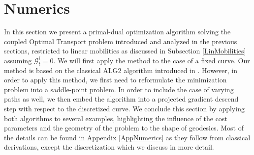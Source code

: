 \documentclass{article}
\def\calG{{\mathcal G}} \def\calH{{\mathcal H}} \def\calI{{\mathcal I}}
\begin{document}
\section{Numerics}\label{Numerics}
In this section we present a primal-dual optimization algorithm solving the coupled Optimal Transport problem introduced and analyzed in the previous sections, restricted to linear mobilities as discussed in Subsection \ref{LinMobilities} assuming $\calG_t^i=0$. We will first apply the method to the case of a fixed curve. Our method is based on the classical ALG2 algorithm introduced in \cite{augmented_1983}. However, in order to apply this method, we first need to reformulate the minimization problem into a saddle-point problem. In order to include the case of varying paths as well, we then embed the algorithm into a projected gradient descend step with respect to the discretized curve. We conclude this section by applying both algorithms to several examples, highlighting the influence of the cost parameters and the geometry of the problem to the shape of geodesics. Most of the details can be found in Appendix \ref{AppNumerics} as they follow from classical derivations, except the discretization which we discuss in more detail.
\end{document}
